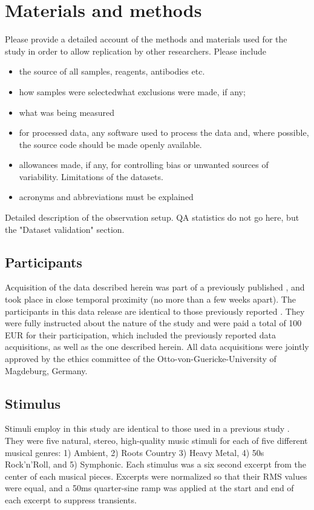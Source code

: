 \section*{Materials and methods} 
Please provide a detailed account of the methods and materials used for the study in order to allow replication by other researchers.
Please include \begin{itemize}
\item 
the source of all samples, reagents, antibodies etc.
\item 
 how samples were selectedwhat exclusions were made, if any;
\item 
what was being measured
\item 
for processed data, any software used to process the data and, where possible, the source code should be made openly available.\item 

allowances made, if any, for controlling bias or unwanted sources of variability.
Limitations of the datasets.\item 

acronyms and abbreviations must be explained
\end{itemize}

Detailed description of the observation setup. QA statistics do not go here, but the "Dataset validation" section.

\subsection*{Participants}

Acquisition of the data described herein was part of a previously published
\cite{Hanke_2014}, and took place in close temporal proximity (no more than a
few weeks apart). The participants in this data release are identical to those
previously reported \cite{Hanke_2014}.  They were fully instructed about the
nature of the study and were paid a total of 100 EUR for their participation,
which included the previously reported data acquisitions, as well as the one
described herein. All data acquisitions were jointly approved by the ethics
committee of the Otto-von-Guericke-University of Magdeburg, Germany.


\subsection*{Stimulus}

Stimuli employ in this study are identical to those used in a previous study
\cite[for details refer to][]{Casey_2012}. They were five natural, stereo,
high-quality music stimuli for each of five different musical genres: 1)
Ambient, 2) Roots Country 3) Heavy Metal, 4) 50s Rock'n'Roll, and 5) Symphonic.
Each stimulus was a six second excerpt from the center of each musical pieces.
Excerpts were normalized so that their RMS values were equal, and a 50ms
quarter-sine ramp was applied at the start and end of each excerpt to suppress
transients.

